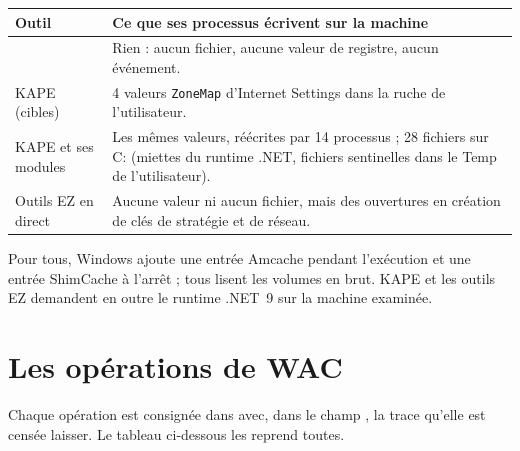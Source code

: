 \documentclass[11pt,a4paper,oneside]{report}
\begin{document}
\begin{longtable}{@{}L{4.3cm}L{10.1cm}@{}}
\toprule
\bfseries Outil & \bfseries Ce que ses processus écrivent sur la machine \\
\midrule
\endhead
\wac{} & Rien : aucun fichier, aucune valeur de registre, aucun événement. \\
KAPE (cibles) & 4 valeurs \texttt{ZoneMap} d'Internet Settings dans la ruche
  de l'utilisateur. \\
KAPE et ses modules & Les mêmes valeurs, réécrites par 14 processus ; 28
  fichiers sur C: (miettes du runtime .NET, fichiers sentinelles dans le Temp
  de l'utilisateur). \\
Outils EZ en direct & Aucune valeur ni aucun fichier, mais des ouvertures en
  création de clés de stratégie et de réseau. \\
\bottomrule
\end{longtable}

Pour tous, Windows ajoute une entrée Amcache pendant l'exécution et une entrée
ShimCache à l'arrêt ; tous lisent les volumes en brut. KAPE et les outils EZ
demandent en outre le runtime .NET~9 sur la machine examinée.

\section{Les opérations de WAC}

Chaque opération est consignée dans  avec, dans le
champ , la trace qu'elle est censée laisser. Le tableau
ci-dessous les reprend toutes.
\end{document}

